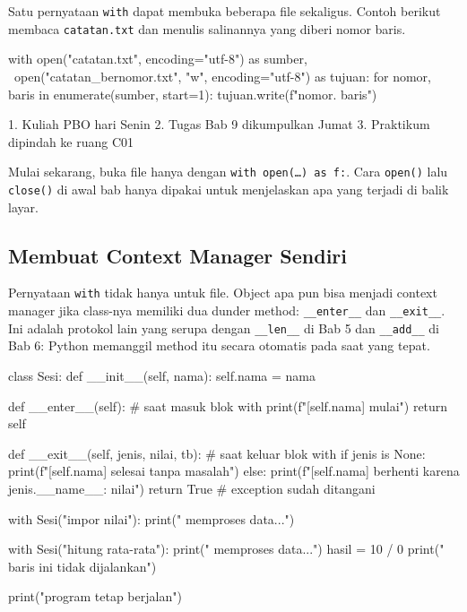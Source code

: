 Satu pernyataan \texttt{with} dapat membuka beberapa file sekaligus. Contoh berikut membaca \texttt{catatan.txt} dan menulis salinannya yang diberi nomor baris.

\begin{kode}
with open("catatan.txt", encoding="utf-8") as sumber, \
     open("catatan_bernomor.txt", "w", encoding="utf-8") as tujuan:
    for nomor, baris in enumerate(sumber, start=1):
        tujuan.write(f"{nomor}. {baris}")
\end{kode}

\begin{keluaran}
1. Kuliah PBO hari Senin
2. Tugas Bab 9 dikumpulkan Jumat
3. Praktikum dipindah ke ruang C01
\end{keluaran}

\begin{tips}
Mulai sekarang, buka file hanya dengan \texttt{with open(\ldots) as f:}. Cara \texttt{open()} lalu \texttt{close()} di awal bab hanya dipakai untuk menjelaskan apa yang terjadi di balik layar.
\end{tips}

\subsection{Membuat Context Manager Sendiri}

Pernyataan \texttt{with} tidak hanya untuk file. Object apa pun bisa menjadi context manager jika class-nya memiliki dua dunder method: \texttt{\_\_enter\_\_} dan \texttt{\_\_exit\_\_}. Ini adalah protokol lain yang serupa dengan \texttt{\_\_len\_\_} di Bab 5 dan \texttt{\_\_add\_\_} di Bab 6: Python memanggil method itu secara otomatis pada saat yang tepat.

\begin{kode}
class Sesi:
    def __init__(self, nama):
        self.nama = nama

    def __enter__(self):                        # saat masuk blok with
        print(f"[{self.nama}] mulai")
        return self

    def __exit__(self, jenis, nilai, tb):       # saat keluar blok with
        if jenis is None:
            print(f"[{self.nama}] selesai tanpa masalah")
        else:
            print(f"[{self.nama}] berhenti karena {jenis.__name__}: {nilai}")
        return True                             # exception sudah ditangani

with Sesi("impor nilai"):
    print("  memproses data...")

with Sesi("hitung rata-rata"):
    print("  memproses data...")
    hasil = 10 / 0
    print("  baris ini tidak dijalankan")

print("program tetap berjalan")
\end{kode}

